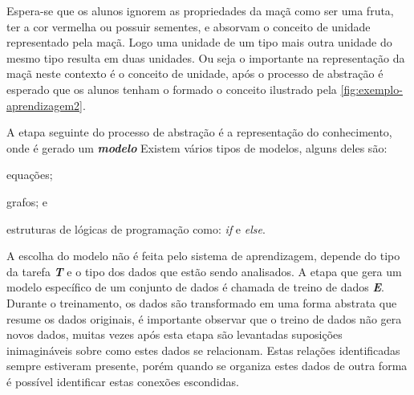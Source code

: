 \begin{figure}[ht!]
	\centering
\end{figure}

Espera-se que os alunos ignorem as propriedades da maçã como ser uma fruta, ter a cor vermelha ou possuir sementes,
e absorvam o conceito de unidade representado pela maçã. Logo uma unidade de um tipo mais outra unidade do mesmo tipo
resulta em duas unidades. Ou seja o importante na representação da maçã neste contexto é o conceito de unidade, após 
o processo de abstração é esperado que os alunos tenham o formado o conceito ilustrado pela \autoref{fig:exemplo-aprendizagem2}.

\begin{figure}[ht!]
	\centering
\end{figure}

A etapa seguinte do processo de abstração é a representação do conhecimento, onde é gerado um 
\textbf{\textit{modelo}} 
Existem vários tipos de modelos, alguns deles são:
\begin{alineas}
    \item equações;
    \item grafos; e
    \item estruturas de lógicas de programação como: \textit{if} e \textit{else}. 
\end{alineas} 

A escolha do modelo não é feita pelo sistema de aprendizagem, depende do tipo da tarefa \textbf{\textit{T}} e o tipo dos dados
que estão sendo analisados. A etapa que gera um modelo específico de um conjunto de dados é chamada de treino de dados \textbf{\textit{E}}. 
Durante o treinamento, os dados são transformado em uma forma abstrata que resume os dados originais, é importante observar que o  
treino de dados não gera novos dados, muitas vezes após esta etapa são levantadas suposições inimagináveis sobre como estes dados se relacionam.
Estas relações identificadas sempre estiveram presente, porém quando se organiza estes dados de outra forma
é possível identificar estas conexões escondidas.

